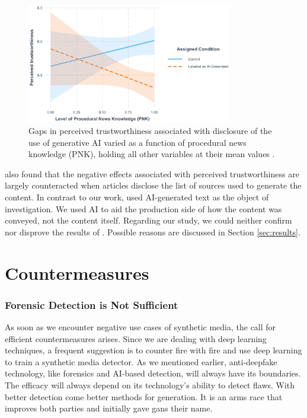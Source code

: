 \documentclass[
  a4paper,  %
  twoside,  %
  bibliography=totoc,
  headsepline,
  cleardoublepage=empty,
  parskip=half,
  draft=false
]{scrbook}
\begin{document}
\begin{figure}[h]
  \centering
  \includegraphics[width=0.8\textwidth]{./graphics/toff/PNK.png}
  \caption{Gaps in perceived trustworthiness associated with disclosure of the use of generative AI varied as a function of procedural news knowledge (PNK), holding all other variables at their mean values \cite{toffTheyCouldJust2023}.}
  \label{fig:toff-PNK}
\end{figure}

\citeauthor{toffTheyCouldJust2023} also found that the negative effects associated with perceived trustworthiness are largely counteracted when articles disclose the list of sources used to generate the content.
In contrast to our work, \citeauthor{toffTheyCouldJust2023} used AI-generated text as the object of investigation. We used AI to aid the production side of how the content was conveyed, not the content itself. Regarding our study, we could neither confirm nor disprove the results of \citet{toffTheyCouldJust2023}. Possible reasons are discussed in Section \ref{sec:results}.

\section{Countermeasures}
\label{sec:rel-work-counteringdf}
\subsubsection*{Forensic Detection is Not Sufficient}
As soon as we encounter negative use cases of synthetic media, the call for efficient countermeasures arises. Since we are dealing with deep learning techniques, a frequent suggestion is to counter fire with fire and use deep learning to train a synthetic media detector. As we mentioned earlier, anti-deepfake technology, like forensics and AI-based detection, will always have its boundaries. The efficacy will always depend on its technology's ability to detect flaws. With better detection come better methods for generation. It is an arms race that improves both parties and initially gave \gls{gan}s their name.
\end{document}
